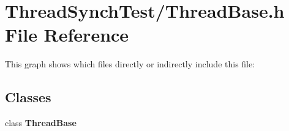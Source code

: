 \section{Thread\-Synch\-Test/Thread\-Base.h File Reference}
\label{_thread_base_8h}


This graph shows which files directly or indirectly include this file:\subsection*{Classes}
\begin{CompactItemize}
\item 
class {\bf Thread\-Base}
\end{CompactItemize}
